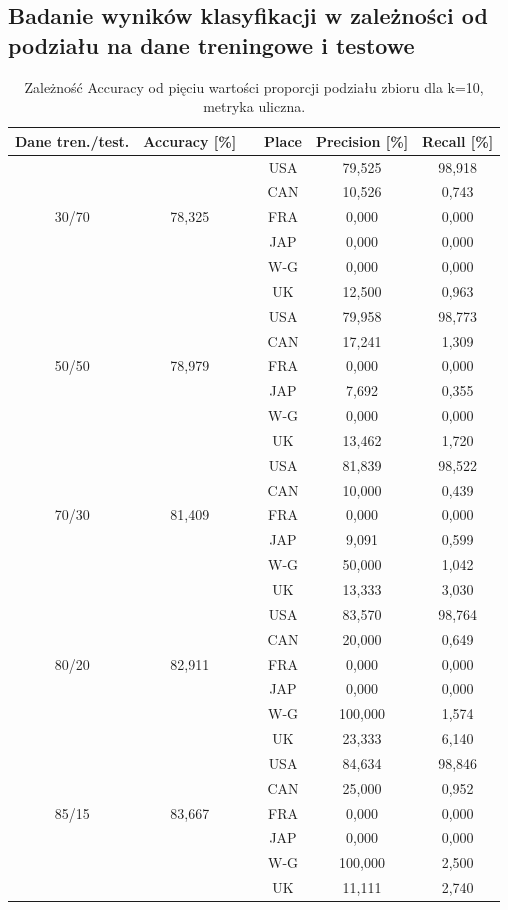 \documentclass{classrep}
\begin{document}
\subsection{Badanie wyników klasyfikacji w zależności od podziału na dane treningowe i testowe}
\begin{table}[h!]
	\centering
	\begin{tabular} {c c c c c c}
		\hline
		\textbf{Dane tren./test.} & \textbf{Accuracy [\%]} & \vline & \textbf{Place} & \textbf{Precision [\%]} & \textbf{Recall [\%]}\\ [0.5ex] 
		\hline 
		\hline 
		&   			&\vline& USA & 79,525 & 98,918 \\
		&				&\vline& CAN & 10,526 & 0,743 \\
		30/70 & 78,325  &\vline& FRA & 0,000 & 0,000 \\
		&				&\vline& JAP & 0,000 & 0,000 \\
    	&				&\vline& W-G & 0,000 & 0,000 \\
		&		 		&\vline& UK  & 12,500 & 0,963 \\
		\hline
		&   			&\vline& USA & 79,958 & 98,773 \\
		&				&\vline& CAN & 17,241 & 1,309 \\
		50/50 & 78,979  &\vline& FRA & 0,000 & 0,000 \\
		&				&\vline& JAP & 7,692 & 0,355 \\
		&				&\vline& W-G & 0,000 & 0,000 \\
		&		 		&\vline& UK  & 13,462 & 1,720 \\
		\hline
		&   			&\vline& USA & 81,839 & 98,522 \\
		&				&\vline& CAN & 10,000 & 0,439 \\
		70/30 & 81,409  &\vline& FRA & 0,000 & 0,000 \\
		&				&\vline& JAP & 9,091 & 0,599 \\
		&				&\vline& W-G & 50,000 & 1,042 \\
		&		 		&\vline& UK  & 13,333 & 3,030 \\
		\hline
		&   			&\vline& USA & 83,570 & 98,764 \\
		&				&\vline& CAN & 20,000 & 0,649 \\
		80/20 & 82,911  &\vline& FRA & 0,000 & 0,000 \\
		&				&\vline& JAP & 0,000 & 0,000 \\
		&				&\vline& W-G & 100,000 & 1,574 \\
		&		 		&\vline& UK  & 23,333 & 6,140 \\
		\hline
		&   			&\vline& USA & 84,634 & 98,846 \\
		&				&\vline& CAN & 25,000 & 0,952 \\
		85/15 & 83,667  &\vline& FRA & 0,000 & 0,000 \\
		&				&\vline& JAP & 0,000 & 0,000 \\
		&				&\vline& W-G & 100,000 & 2,500 \\
		&		 		&\vline& UK  & 11,111 & 2,740 \\
		\hline
		\hline
	\end{tabular}
	\caption{Zależność Accuracy od pięciu wartości proporcji podziału zbioru dla k=10, metryka uliczna. }
	\label{tabelaTT}
\end{table}
\end{document}
